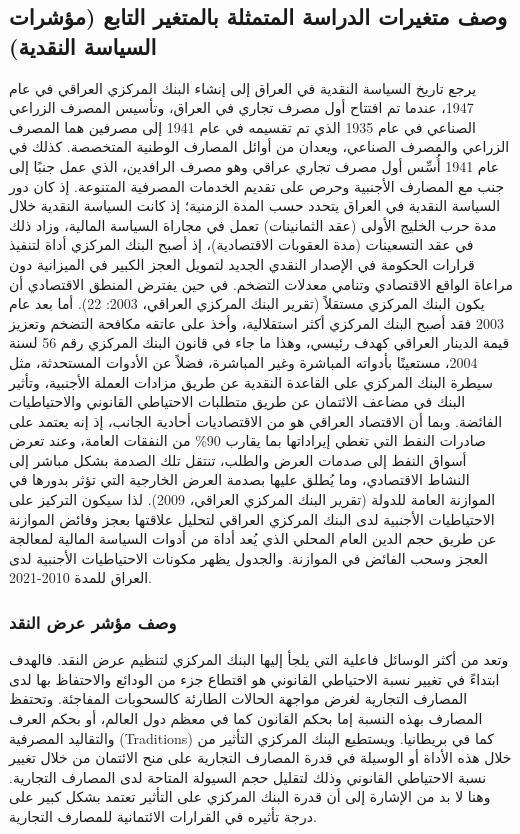 \documentclass[10pt,a4paper]{report}
\begin{document}
\begin{doublespacing}
\subsection{وصف متغيرات الدراسة المتمثلة بالمتغير التابع (مؤشرات السياسة النقدية)}
يرجع تاريخ السياسة النقدية في العراق إلى إنشاء البنك المركزي العراقي في عام 1947، عندما تم افتتاح أول مصرف تجاري في العراق، وتأسيس المصرف الزراعي الصناعي في عام 1935 الذي تم تقسيمه في عام 1941 إلى مصرفين هما المصرف الزراعي والمصرف الصناعي، ويعدان من أوائل المصارف الوطنية المتخصصة. كذلك في عام 1941 أُسِّس أول مصرف تجاري عراقي وهو مصرف الرافدين، الذي عمل جنبًا إلى جنب مع المصارف الأجنبية وحرص على تقديم الخدمات المصرفية المتنوعة. إذ كان دور السياسة النقدية في العراق يتحدد حسب المدة الزمنية؛ إذ كانت السياسة النقدية خلال مدة حرب الخليج الأولى (عقد الثمانينات) تعمل في مجاراة السياسة المالية، وزاد ذلك في عقد التسعينات (مدة العقوبات الاقتصادية)، إذ أصبح البنك المركزي أداة لتنفيذ قرارات الحكومة في الإصدار النقدي الجديد لتمويل العجز الكبير في الميزانية دون مراعاة الواقع الاقتصادي وتنامي معدلات التضخم. في حين يفترض المنطق الاقتصادي أن يكون البنك المركزي مستقلاً (تقرير البنك المركزي العراقي، 2003: 22). أما بعد عام 2003 فقد أصبح البنك المركزي أكثر استقلالية، وأخذ على عاتقه مكافحة التضخم وتعزيز قيمة الدينار العراقي كهدف رئيسي، وهذا ما جاء في قانون البنك المركزي رقم 56 لسنة 2004، مستعينًا بأدواته المباشرة وغير المباشرة، فضلاً عن الأدوات المستحدثة، مثل سيطرة البنك المركزي على القاعدة النقدية عن طريق مزادات العملة الأجنبية، وتأثير البنك في مضاعف الائتمان عن طريق متطلبات الاحتياطي القانوني والاحتياطيات الفائضة. وبما أن الاقتصاد العراقي هو من الاقتصاديات أحادية الجانب، إذ إنه يعتمد على صادرات النفط التي تغطي إيراداتها بما يقارب 90\% من النفقات العامة، وعند تعرض أسواق النفط إلى صدمات العرض والطلب، تنتقل تلك الصدمة بشكل مباشر إلى النشاط الاقتصادي، وما يُطلق عليها بصدمة العرض الخارجية التي تؤثر بدورها في الموازنة العامة للدولة (تقرير البنك المركزي العراقي، 2009). لذا سيكون التركيز على الاحتياطيات الأجنبية لدى البنك المركزي العراقي لتحليل علاقتها بعجز وفائض الموازنة عن طريق حجم الدين العام المحلي الذي يُعد أداة من أدوات السياسة المالية لمعالجة العجز وسحب الفائض في الموازنة. والجدول يظهر مكونات الاحتياطيات الأجنبية لدى العراق للمدة 2010-2021.
\subsubsection{وصف مؤشر عرض النقد}
وتعد من أكثر الوسائل فاعلية التي يلجأ إليها البنك المركزي لتنظيم عرض النقد. فالهدف ابتداءً في تغيير نسبة الاحتياطي القانوني هو اقتطاع جزء من الودائع والاحتفاظ بها لدى المصارف التجارية لغرض مواجهة الحالات الطارئة كالسحوبات المفاجئة. وتحتفظ المصارف بهذه النسبة إما بحكم القانون كما في معظم دول العالم، أو بحكم العرف والتقاليد المصرفية (Traditions) كما في بريطانيا. ويستطيع البنك المركزي التأثير من خلال هذه الأداة أو الوسيلة في قدرة المصارف التجارية على منح الائتمان من خلال تغيير نسبة الاحتياطي القانوني وذلك لتقليل حجم السيولة المتاحة لدى المصارف التجارية. وهنا لا بد من الإشارة إلى أن قدرة البنك المركزي على التأثير تعتمد بشكل كبير على درجة تأثيره في القرارات الائتمانية للمصارف التجارية.


\end{doublespacing}
\end{document}
